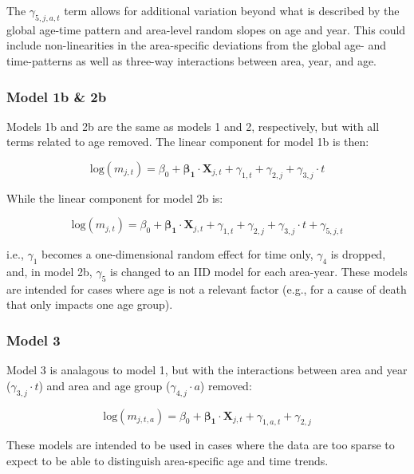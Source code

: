 \documentclass[12pt]{article}
\begin{document}
	The $\gamma_{5,j,a,t}$ term allows for additional variation beyond what is described by the global age-time pattern and area-level random slopes on age and year. This could include non-linearities in the area-specific deviations from the global age- and time-patterns as well as three-way interactions between area, year, and age.

\subsubsection{Model 1b \& 2b}
	Models 1b and 2b are the same as models 1 and 2, respectively, but with all terms related to age removed.
	The linear component for model 1b is then:

	\begin{equation*}
		\text{log}(m_{j,t}) = \beta_0 + \boldsymbol{\beta_1} \cdot \boldsymbol{X}_{j,t} + \gamma_{1,t} + \gamma_{2,j} + \gamma_{3,j} \cdot t
	\end{equation*}

	While the linear component for model 2b is:

	\begin{equation*}
		\text{log}(m_{j,t}) = \beta_0 + \boldsymbol{\beta_1} \cdot \boldsymbol{X}_{j,t} + \gamma_{1,t} + \gamma_{2,j} + \gamma_{3,j} \cdot t + \gamma_{5,j,t}
	\end{equation*}

	i.e., $\gamma_1$ becomes a one-dimensional  random effect for time only, $\gamma_4$ is dropped, and, in model 2b, $\gamma_5$ is changed to an IID model for each area-year.
	These models are intended for cases where age is not a relevant factor (e.g., for a cause of death that only impacts one age group).

\subsubsection{Model 3}
	Model 3 is analagous to model 1, but with the interactions between area and year ($\gamma_{3,j} \cdot t$) and area and age group ($\gamma_{4,j} \cdot a$) removed:

	\begin{equation*}
		\text{log}(m_{j,t,a}) = \beta_0 + \boldsymbol{\beta_1} \cdot \boldsymbol{X}_{j,t} + \gamma_{1,a,t} + \gamma_{2,j}
	\end{equation*}

	These models are intended to be used in cases where the data are too sparse to expect to be able to distinguish area-specific age and time trends.
\end{document}
